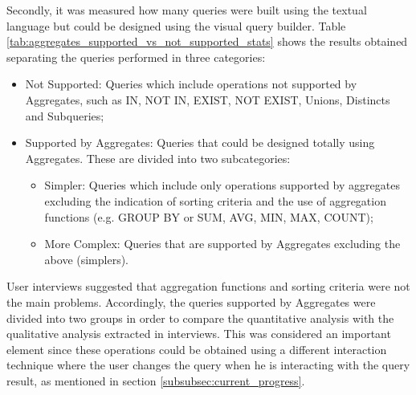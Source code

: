 \begin{table}[tb]
	\caption{Queries that contain operations not supported by Aggregates}
	\label{tab:aggregates_operations_not_supported_stats}
\centering
{}
\end{table}

Secondly, it was measured how many queries were built using the textual language but could be designed using the visual query builder. Table \ref{tab:aggregates_supported_vs_not_supported_stats} shows the results obtained separating the queries performed in three categories:

\begin{itemize}
    \item Not Supported: Queries which include operations not supported by Aggregates, such as IN, NOT IN, EXIST, NOT EXIST, Unions, Distincts and Subqueries;
    \item Supported by Aggregates: Queries that could be designed totally using Aggregates. These are divided into two subcategories:
    \begin{itemize}
        \item Simpler: Queries which include only operations supported by aggregates excluding the indication of sorting criteria and the use of aggregation functions (e.g. GROUP BY or SUM, AVG, MIN, MAX, COUNT);
        \item More Complex: Queries that are supported by Aggregates excluding the above (simplers).
    \end{itemize}
\end{itemize}

User interviews suggested that aggregation functions and sorting criteria were not the main problems. Accordingly, the queries supported by Aggregates were divided into two groups in order to compare the quantitative analysis with the qualitative analysis extracted in interviews. This was considered an important element since these operations could be obtained using a different interaction technique where the user changes the query when he is interacting with the query result, as mentioned in section \ref{subsubsec:current_progress}. 

